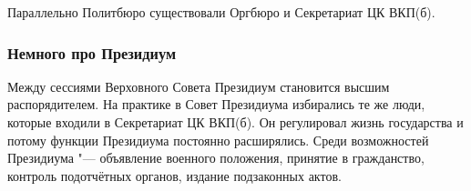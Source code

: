 Параллельно Политбюро существовали Оргбюро и Секретариат ЦК ВКП(б).

\subsubsection{\textbf{Немного про Президиум}}

Между сессиями Верховного Совета Президиум становится высшим распорядителем. На практике в Совет Президиума избирались те же люди, которые входили в Секретариат ЦК ВКП(б). Он регулировал жизнь государства и потому функции Президиума постоянно расширялись. Среди возможностей Президиума "--- объявление военного положения, принятие в гражданство, контроль подотчётных органов, издание подзаконных актов.
